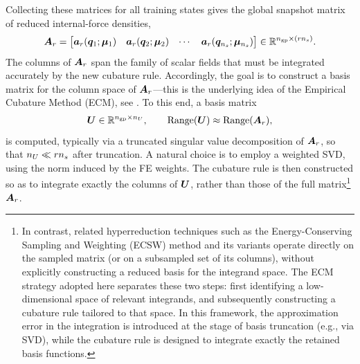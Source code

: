 \documentclass[11pt,a4paper]{article}
\begin{document}
Collecting these matrices for all training states gives the global snapshot
matrix of reduced internal-force densities,
\begin{equation}
     \bm{A}_{r}
    =
    \begin{bmatrix}
        \bm{a}_{r}(\bm{q}_1;\bm{\mu}_1) &
        \bm{a}_{r}(\bm{q}_2;\bm{\mu}_2) &
        \cdots &
        \bm{a}_{r}(\bm{q}_{n_s};\bm{\mu}_{n_s})
    \end{bmatrix}
    \in \mathbb{R}^{n_{\mathrm{gp}}\times(rn_s)}.
    \label{eq:Aforce_training_matrix}
\end{equation}
The columns of $\bm{A}_{r}$ span the family of scalar fields that must be
integrated accurately by the new cubature rule. Accordingly, the goal is to
construct a basis matrix for the column space of $\bm{A}_{r}$---this is the
underlying idea of the Empirical Cubature Method (ECM), see
\cite{hernandez2024cecm}.  To this end, a basis matrix
\begin{equation}
    \bm{U} \in \mathbb{R}^{n_{\mathrm{gp}}\times n_U},
    \qquad
    \operatorname{Range}(\bm{U}) \approx \operatorname{Range}(\bm{A}_{r}),
\end{equation}
is computed, typically via a truncated singular value decomposition of
$\bm{A}_{r}$, so that $n_U \ll rn_s$ after truncation. A natural choice is
to employ a weighted SVD, using the norm induced by the FE weights. The
cubature rule is then constructed so as to integrate exactly the columns of
$\bm{U}$, rather than those of the full matrix\footnote{In contrast, related hyperreduction techniques such as the Energy-Conserving
Sampling and Weighting (ECSW) method and its variants
\cite{farhat2014dimensional,farhat2015structure} operate directly on the sampled
matrix (or on a subsampled set of its columns), without explicitly constructing
a reduced basis for the integrand space. The ECM strategy adopted here separates
these two steps: first identifying a low-dimensional space of relevant
integrands, and subsequently constructing a cubature rule tailored to that
space. In this framework, the approximation error in the integration is
introduced at the stage of basis truncation (e.g., via SVD), while the cubature
rule is designed to integrate exactly the retained basis functions.} $\bm{A}_{r}$.
\end{document}
